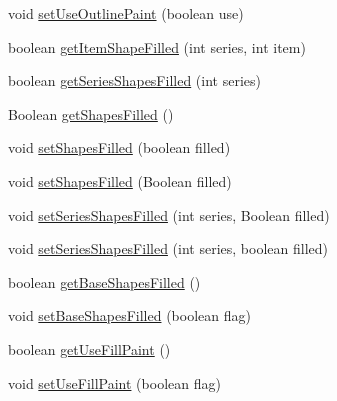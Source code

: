 \begin{DoxyCompactItemize}
\item 
void \mbox{\hyperlink{classorg_1_1jfree_1_1chart_1_1renderer_1_1category_1_1_line_and_shape_renderer_a7b6483898213a5bdbcc7c06e36ebf43d}{set\+Use\+Outline\+Paint}} (boolean use)
\item 
boolean \mbox{\hyperlink{classorg_1_1jfree_1_1chart_1_1renderer_1_1category_1_1_line_and_shape_renderer_ac1f2bcfb33d3fd24ebdee945abc7a913}{get\+Item\+Shape\+Filled}} (int series, int item)
\item 
boolean \mbox{\hyperlink{classorg_1_1jfree_1_1chart_1_1renderer_1_1category_1_1_line_and_shape_renderer_aac2b05949484fcfc43a3ab5201422e55}{get\+Series\+Shapes\+Filled}} (int series)
\item 
Boolean \mbox{\hyperlink{classorg_1_1jfree_1_1chart_1_1renderer_1_1category_1_1_line_and_shape_renderer_a23e8590957112ba46cca634918b3ca3d}{get\+Shapes\+Filled}} ()
\item 
void \mbox{\hyperlink{classorg_1_1jfree_1_1chart_1_1renderer_1_1category_1_1_line_and_shape_renderer_ac5475316d084e8012226667e21b6c317}{set\+Shapes\+Filled}} (boolean filled)
\item 
void \mbox{\hyperlink{classorg_1_1jfree_1_1chart_1_1renderer_1_1category_1_1_line_and_shape_renderer_a63f8d091a4a49eb3b3b7f8646760b7b3}{set\+Shapes\+Filled}} (Boolean filled)
\item 
void \mbox{\hyperlink{classorg_1_1jfree_1_1chart_1_1renderer_1_1category_1_1_line_and_shape_renderer_aee4dbdbf4c584e0d2d9ff04f6e668279}{set\+Series\+Shapes\+Filled}} (int series, Boolean filled)
\item 
void \mbox{\hyperlink{classorg_1_1jfree_1_1chart_1_1renderer_1_1category_1_1_line_and_shape_renderer_a2c692850145976ff52413839710d6a8c}{set\+Series\+Shapes\+Filled}} (int series, boolean filled)
\item 
boolean \mbox{\hyperlink{classorg_1_1jfree_1_1chart_1_1renderer_1_1category_1_1_line_and_shape_renderer_a3992bfda698327b88090c5c1ec73920b}{get\+Base\+Shapes\+Filled}} ()
\item 
void \mbox{\hyperlink{classorg_1_1jfree_1_1chart_1_1renderer_1_1category_1_1_line_and_shape_renderer_a75097e3726320df2362f2dbbbb611f04}{set\+Base\+Shapes\+Filled}} (boolean flag)
\item 
boolean \mbox{\hyperlink{classorg_1_1jfree_1_1chart_1_1renderer_1_1category_1_1_line_and_shape_renderer_a3bef1f4102b2426d4eddedb81394037c}{get\+Use\+Fill\+Paint}} ()
\item 
void \mbox{\hyperlink{classorg_1_1jfree_1_1chart_1_1renderer_1_1category_1_1_line_and_shape_renderer_ab3eb0245173ab97f09ab32375ed958ad}{set\+Use\+Fill\+Paint}} (boolean flag)

\end{DoxyCompactItemize}
